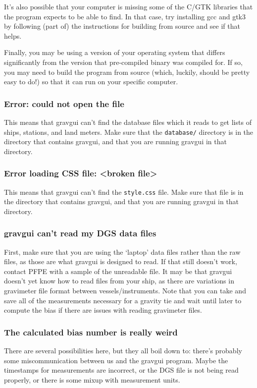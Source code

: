\documentclass{pfpe-manual}
\begin{document}
It's also possible that your computer is missing some of the C/GTK libraries that the program expects to be able to find. In that case, try installing gcc and gtk3 by following (part of) the instructions for building from source and see if that helps.

Finally, you may be using a version of your operating system that differs significantly from the version that pre-compiled binary was compiled for. If so, you may need to build the program from source (which, luckily, should be pretty easy to do!) so that it can run on your specific computer.

\subsubsection{Error: could not open the file}
This means that gravgui can't find the database files which it reads to get lists of ships, stations, and land meters. Make sure that the \texttt{database/} directory is in the directory that contains gravgui, and that you are running gravgui in that directory.

\subsubsection{Error loading CSS file: <broken file>}
This means that gravgui can't find the \texttt{style.css} file. Make sure that file is in the directory that contains gravgui, and that you are running gravgui in that directory.

\subsubsection{gravgui can't read my DGS data files}
First, make sure that you are using the `laptop' data files rather than the raw files, as those are what gravgui is designed to read. If that still doesn't work, contact PFPE with a sample of the unreadable file. It may be that gravgui doesn't yet know how to read files from your ship, as there are variations in gravimeter file format between vessels/instruments. Note that you can take and save all of the measurements necessary for a gravity tie and wait until later to compute the bias if there are issues with reading gravimeter files.

\subsubsection{The calculated bias number is really weird}
There are several possibilities here, but they all boil down to: there's probably some miscommunication between us and the gravgui program. Maybe the timestamps for measurements are incorrect, or the DGS file is not being read properly, or there is some mixup with measurement units. 
\end{document}

